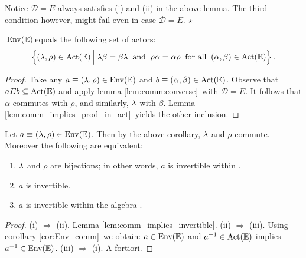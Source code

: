\begin{remark} \label{rem:comm:converse}  \rm
  Notice ${\mathcal D} = E$ always satisfies (i) and (ii) in the above lemma.
  The third condition however, might fail even in case ${\mathcal D} = E$.
  \hfill $\star$
\end{remark}


\begin{cor}   \label{cor:Env_comm}
  $\:\mbox{\rm Env}(\mathbb{E})\!$ equals the following set of actors: \rm
  $$ \left\{ (\lam,\rho) \in \ActE  \left| \vertL\right.
     \lam\beta  = \beta\lam  \: \mbox{ and } \:
     \rho\alpha = \alpha\rho \:
     \mbox { for all } \: (\alpha,\beta) \in \ActE \right\}.  $$
\end{cor}
\begin{proof}
  Take any $a\equiv(\lambda,\rho)\in\mbox{\rm Env}(\mathbb{E})$ and $b\equiv(\alpha,\beta) \in \mbox{\rm Act}(\mathbb{E})$.
  Observe that $aEb \subseteq \mbox{\rm Act}(\mathbb{E})$ and apply lemma \ref{lem:comm:converse}\
  with ${\mathcal D}=E$. It follows that $\alpha$ commutes with $\rho$, and
  similarly, $\lambda$ with $\beta$.
  Lemma \ref{lem:comm_implies_prod_in_act}\ yields the other inclusion.
\end{proof}



\begin{lemma}  \label{lem:invertibility_in_EnvE}
  Let\/ $a\equiv(\lambda,\rho) \in \mbox{\rm Env}(\mathbb{E})$. Then by the above corollary,
  $\lambda$ and $\rho$ commute. Moreover the following are equivalent:
  \begin{enumerate}
    \item $\lambda$ and $\rho$ are bijections; in other words,
          $a$ is invertible within\/ \PreE.
    \item $a$ is\/ \EEdash invertible.
    \item $a$ is invertible within the algebra\/ \EnvE.
  \end{enumerate}
\end{lemma}

\begin{proof}
(i) $\Rightarrow$ (ii).
  Lemma \ref{lem:comm_implies_invertible}\@.
(ii) $\Rightarrow$ (iii).
  Using corollary \ref{cor:Env_comm}\ we obtain:
  $a \in \mbox{\rm Env}(\mathbb{E})$ and $a^{-1} \in \mbox{\rm Act}(\mathbb{E})$ implies $a^{-1} \in \mbox{\rm Env}(\mathbb{E})$.
(iii) $\Rightarrow$ (i).  A fortiori.
\end{proof}


